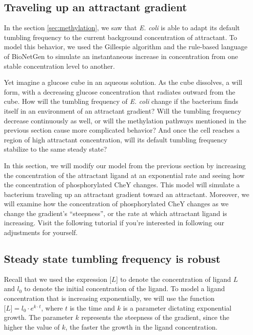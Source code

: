 \subsection{Traveling up an attractant gradient}


In the section \autoref{sec:methylation}, we saw that \textit{E. coli} is able to adapt its default tumbling frequency to the current background concentration of attractant. To model this behavior, we used the Gillespie algorithm and the rule-based language of BioNetGen to simulate an instantaneous increase in concentration from one stable concentration level to another.

Yet imagine a glucose cube in an aqueous solution. As the cube dissolves, a  will form, with a decreasing glucose concentration that radiates outward from the cube. How will the tumbling frequency of \textit{E. coli} change if the bacterium finds itself in an environment of an attractant gradient?  Will the tumbling frequency decrease continuously as well, or will the methylation pathways mentioned in the previous section cause more complicated behavior? And once the cell reaches a region of high attractant concentration, will its default tumbling frequency stabilize to the same steady state?

In this section, we will modify our model from the previous section by increasing the concentration of the attractant ligand at an exponential rate and seeing how the concentration of phosphorylated CheY changes. This model will simulate a bacterium traveling up an attractant gradient toward an attractant. Moreover, we will examine how the concentration of phosphorylated CheY changes as we change the gradient's ``steepness'', or the rate at which attractant ligand is increasing. Visit the following tutorial  if you're interested in following our adjustments for yourself.

\subsection{Steady state tumbling frequency is robust}

Recall that we used the expression $\text{[}L\text{]}$ to denote the concentration of ligand $L$ and $l_0$ to denote the initial concentration of the ligand. To model a ligand concentration that is increasing exponentially, we will use the function $\text{[}L\text{]} = l_0 \cdot e^{k \cdot t}$, where $t$ is the time and $k$ is a parameter dictating exponential growth. The parameter $k$ represents the steepness of the gradient, since the higher the value of $k$, the faster the growth in the ligand concentration.

